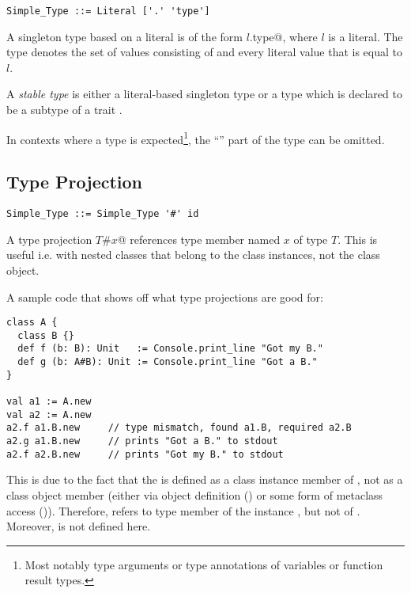 \syntax\begin{lstlisting}
Simple_Type ::= Literal ['.' 'type']
\end{lstlisting}

A singleton type based on a literal is of the form \lstinline@$l$.type@, where $l$ is a literal. The type denotes the set of values consisting of  and every literal value that is equal to $l$. 

A {\em stable type} is either a literal-based singleton type or a type which is declared to be a subtype of a trait . 

In contexts where a type is expected\footnote{Most notably type arguments or type annotations of variables or function result types.}, the ``'' part of the type can be omitted. 





\subsection{Type Projection}
\label{sec:type-projection}

\syntax\begin{lstlisting}
Simple_Type ::= Simple_Type '#' id
\end{lstlisting}

A type projection \lstinline@$T$#$x$@ references type member named $x$ of type $T$. This is useful i.e. with nested classes that belong to the class instances, not the class object. 

\example A sample code that shows off what type projections are good for:
\begin{lstlisting}
class A {
  class B {}
  def f (b: B): Unit   := Console.print_line "Got my B."
  def g (b: A#B): Unit := Console.print_line "Got a B."
}

val a1 := A.new
val a2 := A.new
a2.f a1.B.new     // type mismatch, found a1.B, required a2.B
a2.g a1.B.new     // prints "Got a B." to stdout
a2.f a2.B.new     // prints "Got my B." to stdout
\end{lstlisting}
This is due to the fact that the  is defined as a class instance member of , not as a class object member (either via object definition () or some form of metaclass access ()). Therefore,  refers to type member  of the instance , but not of . Moreover,  is not defined here. 

